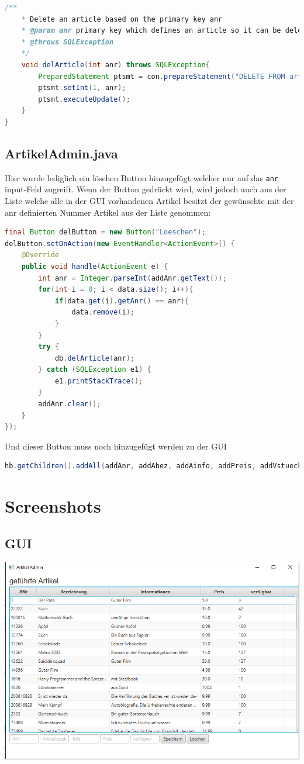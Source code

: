 \begin{lstlisting}[language=Java]
	/**
	* Delete an article based on the primary key anr
	* @param anr primary key which defines an article so it can be deleted
	* @throws SQLException
	*/
	void delArticle(int anr) throws SQLException{
		PreparedStatement ptsmt = con.prepareStatement("DELETE FROM artikel WHERE anr=?");
		ptsmt.setInt(1, anr);
		ptsmt.executeUpdate();
	}
}
\end{lstlisting}

\subsection{ArtikelAdmin.java}
Hier wurde lediglich ein löschen Button hinzugefügt welcher nur auf das \verb|anr| input-Feld zugreift. Wenn der Button gedrückt wird, wird jedoch auch aus der Liste welche alle in der GUI vorhandenen Artikel besitzt der gewünschte mit der anr definierten Nummer Artikel aus der Liste genommen:

\begin{lstlisting}[language=Java]
final Button delButton = new Button("Loeschen");
delButton.setOnAction(new EventHandler<ActionEvent>() {
	@Override
	public void handle(ActionEvent e) {
		int anr = Integer.parseInt(addAnr.getText());
		for(int i = 0; i < data.size(); i++){
			if(data.get(i).getAnr() == anr){
				data.remove(i);
			}
		}
		try {
			db.delArticle(anr);
		} catch (SQLException e1) {
			e1.printStackTrace();
		}
		addAnr.clear();
	}
});
\end{lstlisting}

Und dieser Button muss noch hinzugefügt werden zu der GUI

\begin{lstlisting}[language=Java]
hb.getChildren().addAll(addAnr, addAbez, addAinfo, addPreis, addVstueckz, addButton,delButton);
\end{lstlisting}

\section{Screenshots}
\subsection{GUI}
\begin{minipage}{\linewidth}
	\centering
	\includegraphics[width=0.8\linewidth]{images/gui}
\end{minipage}

